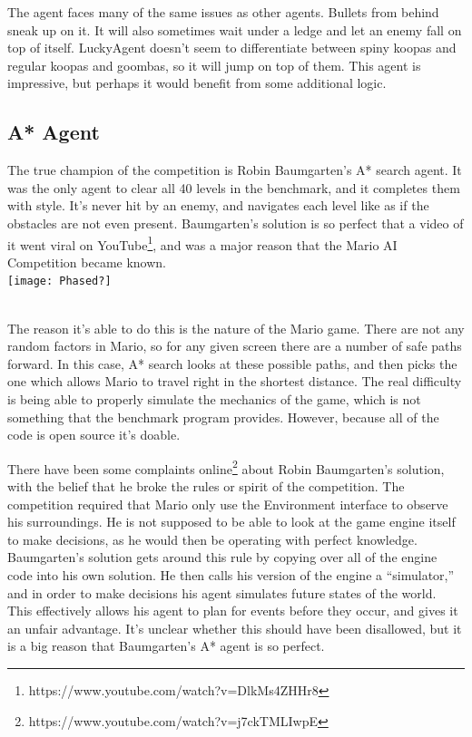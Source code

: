 \documentclass[12pt]{article}
\begin{document}
\begin{multicols*}{2}
The agent faces many of the same issues as other agents.  Bullets from behind sneak up on it.  It 
will also sometimes wait under a ledge and let an enemy fall on top of itself.  LuckyAgent doesn't seem 
to differentiate between spiny koopas and regular koopas and goombas, so it will jump on top of them.  
This agent is impressive, but perhaps it would benefit from some additional logic.

\subsection*{A* Agent}
The true champion of the competition is Robin Baumgarten's A* search agent.  It was the only agent 
to clear all 40 levels in the benchmark, and it completes them with style.  It's never hit by an enemy, 
and navigates each level like as if the obstacles are not even present.  Baumgarten's solution is 
so perfect that a video of it went viral on YouTube\footnote{
https://www.youtube.com/watch?v=DlkMs4ZHHr8}, and was a major reason that the 
Mario AI Competition became known.
\hspace{5mm}
\\

\begingroup
    \centering
    \texttt{[image: Phased?]}
\endgroup

\hspace{5mm}
\\
\indent The reason it's able to do this is the nature of the Mario game.  There are not any random factors in 
Mario, so for any given screen there are a number of safe paths forward.  In this case, A* search 
looks at these possible paths, and then picks the one which allows Mario to travel right in the shortest 
distance.  The real difficulty is being able to properly simulate the mechanics of the game, which is 
not something that the benchmark program provides.  However, because all of the code is open source 
it's doable.

There have been some complaints online\footnote{
https://www.youtube.com/watch?v=j7ckTMLIwpE} 
about Robin Baumgarten's solution, with the belief that 
he broke the rules or spirit of the competition.  The competition required that Mario only use the 
Environment interface to observe his surroundings.  He is not supposed to be able to look at the game 
engine itself to make decisions, as he would then be operating with perfect knowledge.  
Baumgarten's solution gets around this rule by copying over all of the engine code into his own 
solution.  He then calls his version of the engine a ``simulator,'' and in order to make decisions 
his agent simulates future states of the world.  This effectively allows his agent to plan for events 
before they occur, and gives it an unfair advantage.  It's unclear whether this should have been 
disallowed, but it is a big reason that Baumgarten's A* agent is so perfect.


\end{multicols*}
\end{document}
